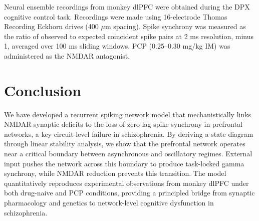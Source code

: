 \documentclass[11pt]{article}
\begin{document}
Neural ensemble recordings from monkey dlPFC were obtained during the DPX cognitive control task. Recordings were made using 16-electrode Thomas Recording Eckhorn drives (400 $\mu$m spacing). Spike synchrony was measured as the ratio of observed to expected coincident spike pairs at 2 ms resolution, minus 1, averaged over 100 ms sliding windows. PCP (0.25--0.30 mg/kg IM) was administered as the NMDAR antagonist.

\section{Conclusion}

We have developed a recurrent spiking network model that mechanistically links NMDAR synaptic deficits to the loss of zero-lag spike synchrony in prefrontal networks, a key circuit-level failure in schizophrenia. By deriving a state diagram through linear stability analysis, we show that the prefrontal network operates near a critical boundary between asynchronous and oscillatory regimes. External input pushes the network across this boundary to produce task-locked gamma synchrony, while NMDAR reduction prevents this transition. The model quantitatively reproduces experimental observations from monkey dlPFC under both drug-naive and PCP conditions, providing a principled bridge from synaptic pharmacology and genetics to network-level cognitive dysfunction in schizophrenia.



\end{document}
